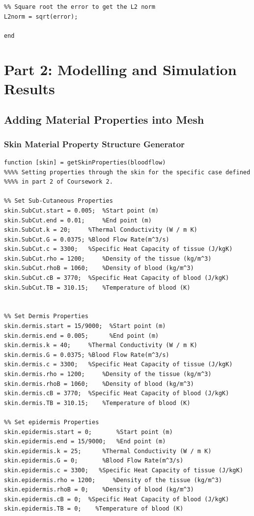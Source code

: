 \documentclass[11pt]{article}
\begin{document}
\begin{appendices}
\begin{lstlisting}
%% Square root the error to get the L2 norm
L2norm = sqrt(error);

end
\end{lstlisting}
\pagebreak

\section{Part 2: Modelling and Simulation Results}

\subsection{Adding Material Properties into Mesh}

\subsubsection{Skin Material Property Structure Generator}
\begin{lstlisting}
function [skin] = getSkinProperties(bloodflow)
%%%% Setting properties through the skin for the specific case defined
%%%% in part 2 of Coursework 2. 

%% Set Sub-Cutaneous Properties
skin.SubCut.start = 0.005;  %Start point (m)
skin.SubCut.end = 0.01;     %End point (m)
skin.SubCut.k = 20;     %Thermal Conductivity (W / m K)
skin.SubCut.G = 0.0375; %Blood Flow Rate(m^3/s)
skin.SubCut.c = 3300;   %Specific Heat Capacity of tissue (J/kgK)
skin.SubCut.rho = 1200;     %Density of the tissue (kg/m^3)
skin.SubCut.rhoB = 1060;    %Density of blood (kg/m^3)
skin.SubCut.cB = 3770;  %Specific Heat Capacity of blood (J/kgK)
skin.SubCut.TB = 310.15;    %Temperature of blood (K)


%% Set Dermis Properties
skin.dermis.start = 15/9000;  %Start point (m)
skin.dermis.end = 0.005;      %End point (m)
skin.dermis.k = 40;     %Thermal Conductivity (W / m K)
skin.dermis.G = 0.0375; %Blood Flow Rate(m^3/s)
skin.dermis.c = 3300;   %Specific Heat Capacity of tissue (J/kgK)
skin.dermis.rho = 1200;     %Density of the tissue (kg/m^3)
skin.dermis.rhoB = 1060;    %Density of blood (kg/m^3)
skin.dermis.cB = 3770;  %Specific Heat Capacity of blood (J/kgK)
skin.dermis.TB = 310.15;    %Temperature of blood (K)

%% Set epidermis Properties
skin.epidermis.start = 0;       %Start point (m)
skin.epidermis.end = 15/9000;   %End point (m)
skin.epidermis.k = 25;      %Thermal Conductivity (W / m K)
skin.epidermis.G = 0;       %Blood Flow Rate(m^3/s)
skin.epidermis.c = 3300;   %Specific Heat Capacity of tissue (J/kgK)
skin.epidermis.rho = 1200;     %Density of the tissue (kg/m^3)
skin.epidermis.rhoB = 0;    %Density of blood (kg/m^3)
skin.epidermis.cB = 0;  %Specific Heat Capacity of blood (J/kgK)
skin.epidermis.TB = 0;    %Temperature of blood (K)


\end{lstlisting}
\end{appendices}
\end{document}
